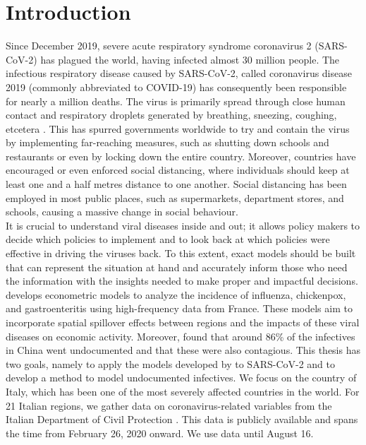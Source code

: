 \documentclass[12pt]{article}
\begin{document}
	\newpage
	
	\tableofcontents
	
	\newpage
	
	\section{Introduction} \label{sec:introduction}
	Since December 2019, severe acute respiratory syndrome coronavirus 2 (SARS-CoV-2) has plagued the world, having infected almost 30 million people. The infectious respiratory disease caused by SARS-CoV-2, called coronavirus disease 2019 (commonly abbreviated to COVID-19) has consequently been responsible for nearly a million deaths. The virus is primarily spread through close human contact and respiratory droplets generated by breathing, sneezing, coughing, etcetera \parencite{ecdc2020transmission}. This has spurred governments worldwide to try and contain the virus by implementing far-reaching measures, such as shutting down schools and restaurants or even by locking down the entire country. Moreover, countries have encouraged or even enforced social distancing, where individuals should keep at least one and a half metres distance to one another. Social distancing has been employed in most public places, such as supermarkets, department stores, and schools, causing a massive change in social behaviour. \\

	It is crucial to understand viral diseases inside and out; it allows policy makers to decide which policies to implement and to look back at which policies were effective in driving the viruses back. To this extent, exact models should be built that can represent the situation at hand and accurately inform those who need the information with the insights needed to make proper and impactful decisions. \textcite{adda2016economic} develops econometric models to analyze the incidence of influenza, chickenpox, and gastroenteritis using high-frequency data from France. These models aim to incorporate spatial spillover effects between regions and the impacts of these viral diseases on economic activity. Moreover, \textcite{li2020undocumented} found that around 86\% of the infectives in China went undocumented and that these were also contagious. This thesis has two goals, namely to apply the models developed by \textcite{adda2016economic} to SARS-CoV-2 and to develop a method to model undocumented infectives. We focus on the country of Italy, which has been one of the most severely affected countries in the world. For 21 Italian regions, we gather data on coronavirus-related variables from the Italian Department of Civil Protection \parencite{Rosini2020Github}. This data is publicly available and spans the time from February 26, 2020 onward. We use data until August 16. \\
	
\end{document}
